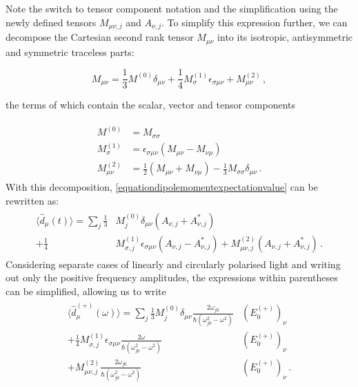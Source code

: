 \documentclass[../Thesis-IJspeert.tex]{subfiles}
\begin{document}
Note the switch to tensor component notation and the simplification using the newly defined tensors $M_{\mu\nu,j}$ and $A_{\nu,j}$. To simplify this expression further, we can decompose the Cartesian second rank tensor $M_{\mu\nu}$ into its isotropic, antisymmetric and symmetric traceless parts:


\begin{equation}
\label{irreduciblerepcartesian}
	M_{\mu\nu}=\frac{1}{3}M^{(0)}\delta_{\mu\nu} + \frac{1}{4}M_{\sigma}^{(1)}\epsilon_{\sigma\mu\nu} + M_{\mu\nu}^{(2)} \,,
\end{equation}


the terms of which contain the scalar, vector and tensor components

\begin{align}
\begin{split}
 M^{(0)} &= M_{\sigma\sigma} \\
 M^{(1)}_\sigma &= \epsilon_{\sigma\mu\nu}(M_{\mu\nu}-M_{\nu\mu}) \\
 M^{(2)}_{\mu\nu} &= \frac{1}{2}(M_{\mu\nu}+M_{\nu\mu}) - \frac{1}{3}M_{\sigma\sigma}\delta_{\mu\nu} \,.
\end{split}
\end{align}
With this decomposition, \autoref{equationdipolemomentexpectationvalue} can be rewritten as:
\begin{align}
\begin{split}
\langle \hat{d}_\mu (t) \rangle = \sum_j \frac{1}{3}&M^{(0)}_j \delta_{\mu\nu} \left(A_{\nu,j}+A_{\nu,j}^*\right) \\+ \frac{1}{4} &M^{(1)}_{\sigma,j} \epsilon_{\sigma\mu\nu} \left( A_{\nu,j} - A_{\nu,j}^* \right) + M^{(2)}_{\mu\nu,j} \left( A_{\nu,j}+A_{\nu,j}^*\right) \,.
\end{split}
\end{align}
Considering separate cases of linearly and circularly polarised light and writing out only the positive frequency amplitudes, the expressions within parentheses can be simplified, allowing us to write
\begin{align}
\label{dipolemomentintermsofirreduciblerep}
\begin{split}
\langle \hat{d}^{(+)}_\mu (\omega) \rangle = \sum_j \frac{1}{3} M^{(0)}_j \delta_{\mu\nu} \frac{2\omega_{j0} }{\hbar (\omega_{j0}^2-\omega^2)} &( E_0^{(+)} )_\nu \\+ \frac{1}{4} M^{(1)}_{\sigma,j} \epsilon_{\sigma\mu\nu} \frac{2\omega }{\hbar (\omega_{j0}^2-\omega^2)} &( E_0^{(+)} )_\nu \\+ M^{(2)}_{\mu\nu,j} \frac{2\omega_{j0} }{\hbar (\omega_{j0}^2-\omega^2)} &( E_0^{(+)} )_\nu \,.
\end{split}
\end{align}
\end{document}
